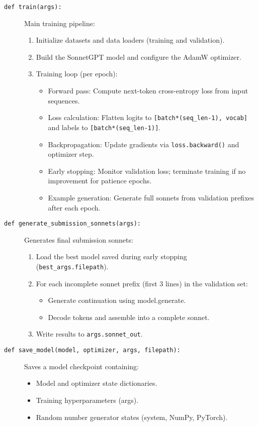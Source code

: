 \begin{description}
\item[\texttt{def train(args):}]
Main training pipeline:
\begin{enumerate}
\item Initialize datasets and data loaders (training and validation).
\item Build the SonnetGPT model and configure the AdamW optimizer.
\item Training loop (per epoch):
\begin{itemize}
\item Forward pass: Compute next-token cross-entropy loss from input sequences.
\item Loss calculation: Flatten logits to \texttt{[batch*(seq\_len-1), vocab]} and labels to \texttt{[batch*(seq\_len-1)]}.
\item Backpropagation: Update gradients via \texttt{loss.backward()} and optimizer step.
\item Early stopping: Monitor validation loss; terminate training if no improvement for patience epochs.
\item Example generation: Generate full sonnets from validation prefixes after each epoch.
\end{itemize}
\end{enumerate}

\item[\texttt{def generate\_submission\_sonnets(args):}]
Generates final submission sonnets:
\begin{enumerate}
\item Load the best model saved during early stopping (\texttt{best\_{args.filepath}}).
\item For each incomplete sonnet prefix (first 3 lines) in the validation set:
\begin{itemize}
\item Generate continuation using model.generate.
\item Decode tokens and assemble into a complete sonnet.
\end{itemize}
\item Write results to \texttt{args.sonnet\_out}.
\end{enumerate}

\item[\texttt{def save\_model(model, optimizer, args, filepath):}]
Saves a model checkpoint containing:
\begin{itemize}
\item Model and optimizer state dictionaries.
\item Training hyperparameters (args).
\item Random number generator states (system, NumPy, PyTorch).
\end{itemize}


\end{description}
